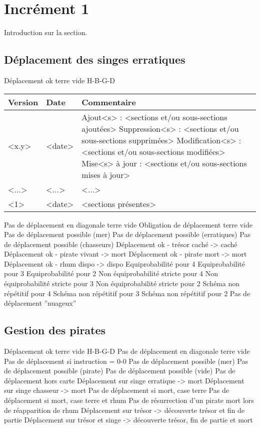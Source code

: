 %

\section{Incrément 1}
\label{sec:increment1}

Introduction sur la section.

\subsection{Déplacement des singes erratiques}
\label{subsec:titresection:titresoussection1}

Déplacement ok terre vide H-B-G-D

\begin{tabular}{|p{1.5cm}|p{2cm}|p{10.1cm}|}\hline
\textbf{Version} & \textbf{Date} & \textbf{Commentaire} \\\hline
<x.y> & <date> & Ajout<s> : <sections et/ou sous-sections ajoutées> \newline Suppression<s> : <sections et/ou sous-sections supprimées> \newline Modification<s> : <sections et/ou sous-sections modifiées> \newline Mise<s> à jour : <sections et/ou sous-sections mises à jour> \\
<...> & <...> & <...> \\
<1\iere{}> & <date> & <sections présentes> \\\hline
\end{tabular}


Pas de déplacement en diagonale terre vide 
Obligation de déplacement terre vide
Pas de déplacement possible (mer)
Pas de déplacement possible (erratiques)
Pas de déplacement possible (chasseurs)
Déplacement ok - trésor caché -> caché
Déplacement ok - pirate vivant -> mort
Déplacement ok - pirate mort -> mort
Déplacement ok - rhum dispo -> dispo
Equiprobabilité pour 4
Equiprobabilité pour 3
Equiprobabilité pour 2
Non équiprobabilité stricte pour 4
Non équiprobabilité stricte pour 3
Non équiprobabilité stricte pour 2
Schéma non répétitif pour 4
Schéma non répétitif pour 3
Schéma non répétitif pour 2
Pas de déplacement ”nuageux”


\subsection{Gestion des pirates}
\label{subsec:titresection:titresoussection2}

Déplacement ok terre vide H-B-G-D
Pas de déplacement en diagonale terre vide
Pas de déplacement si instruction = 0-0
Pas de déplacement possible (mer)
Pas de déplacement possible (pirate)
Pas de déplacement possible (vide)
Pas de déplacement hors carte
Déplacement sur singe erratique -> mort
Déplacement sur singe chasseur -> mort
Pas de déplacement si mort, case terre
Pas de déplacement si mort, case terre et rhum
Pas de résurrection d’un pirate mort lors de réapparition de
rhum
Déplacement sur trésor -> découverte trésor et fin de partie
Déplacement sur trésor et singe -> découverte trésor, fin de
partie et mort
